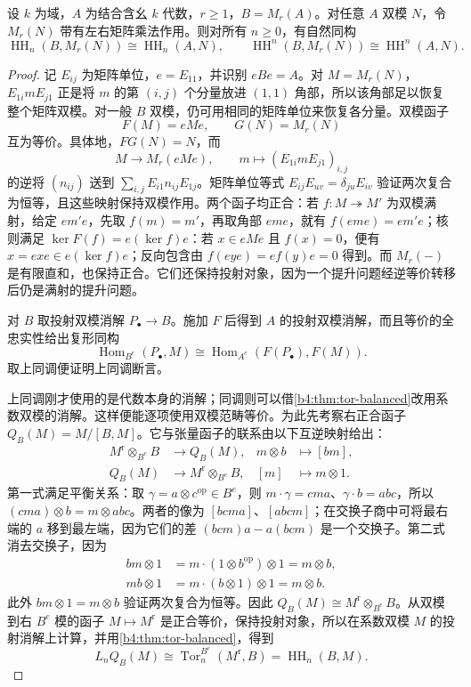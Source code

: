 \begin{theorem}\label{b4:thm:hh-matrix-morita}
	设 \(k\) 为域，\(A\) 为结合含幺 \(k\) 代数，\(r\ge1\)，\(B=M_r(A)\)。对任意 \(A\) 双模 \(N\)，令 \(M_r(N)\) 带有左右矩阵乘法作用。则对所有 \(n\ge0\)，有自然同构
	\[
		\operatorname{HH}_n(B,M_r(N))\cong\operatorname{HH}_n(A,N),\qquad \operatorname{HH}^n(B,M_r(N))\cong\operatorname{HH}^n(A,N).
	\]
\end{theorem}
\begin{proof}
	记 \(E_{ij}\) 为矩阵单位，\(e=E_{11}\)，并识别 \(eBe=A\)。对 \(M=M_r(N)\)，\(E_{1i}mE_{j1}\) 正是将 \(m\) 的第 \((i,j)\) 个分量放进 \((1,1)\) 角部，所以该角部足以恢复整个矩阵双模。对一般 \(B\) 双模，仍可用相同的矩阵单位来恢复各分量。双模函子
	\[
		F(M)=eMe,\qquad G(N)=M_r(N)
	\]
	互为等价。具体地，\(FG(N)=N\)，而
	\[
		M\longrightarrow M_r(eMe),\qquad m\longmapsto(E_{1i}mE_{j1})_{i,j}
	\]
	的逆将 \((n_{ij})\) 送到 \(\sum_{i,j}E_{i1}n_{ij}E_{1j}\)。矩阵单位等式 \(E_{ij}E_{uv}=\delta_{ju}E_{iv}\) 验证两次复合为恒等，且这些映射保持双模作用。两个函子均正合：若 \(f:M\twoheadrightarrow M'\) 为双模满射，给定 \(em'e\)，先取 \(f(m)=m'\)，再取角部 \(eme\)，就有 \(f(eme)=em'e\)；核则满足 \(\ker F(f)=e(\ker f)e\)：若 \(x\in eMe\) 且 \(f(x)=0\)，便有 \(x=exe\in e(\ker f)e\)；反向包含由 \(f(eye)=ef(y)e=0\) 得到。而 \(M_r(-)\) 是有限直和，也保持正合。它们还保持投射对象，因为一个提升问题经逆等价转移后仍是满射的提升问题。

	对 \(B\) 取投射双模消解 \(P_\bullet\to B\)。施加 \(F\) 后得到 \(A\) 的投射双模消解，而且等价的全忠实性给出复形同构
	\[
		\operatorname{Hom}_{B^e}(P_\bullet,M) \cong\operatorname{Hom}_{A^e}(F(P_\bullet),F(M)).
	\]
	取上同调便证明上同调断言。

	上同调刚才使用的是代数本身的消解；同调则可以借\cref{b4:thm:tor-balanced}改用系数双模的消解。这样便能逐项使用双模范畴等价。为此先考察右正合函子 \(Q_B(M)=M/[B,M]\)。它与张量函子的联系由以下互逆映射给出：
	\[
		\begin{aligned}
			M^{\mathrm r}\otimes_{B^e}B&\longrightarrow Q_B(M), &m\otimes b&\longmapsto[bm],\\
			Q_B(M)&\longrightarrow M^{\mathrm r}\otimes_{B^e}B, &[m]&\longmapsto m\otimes1.
		\end{aligned}
	\]
	第一式满足平衡关系：取 \(\gamma=a\otimes c^{\mathrm{op}}\in B^e\)，则 \(m\cdot\gamma=cma\)、\(\gamma\cdot b=abc\)，所以 \((cma)\otimes b=m\otimes abc\)。两者的像为 \([bcma]\)、\([abcm]\)；在交换子商中可将最右端的 \(a\) 移到最左端，因为它们的差 \((bcm)a-a(bcm)\) 是一个交换子。第二式消去交换子，因为
	\[
		\begin{aligned}
			bm\otimes1 &=m\cdot(1\otimes b^{\mathrm{op}})\otimes1 =m\otimes b,\\
			mb\otimes1 &=m\cdot(b\otimes1)\otimes1 =m\otimes b.
		\end{aligned}
	\]
	此外 \(bm\otimes1=m\otimes b\) 验证两次复合为恒等。因此 \(Q_B(M)\cong M^{\mathrm r}\otimes_{B^e}B\)。从双模到右 \(B^e\) 模的函子 \(M\mapsto M^{\mathrm r}\) 是正合等价，保持投射对象，所以在系数双模 \(M\) 的投射消解上计算，并用\cref{b4:thm:tor-balanced}，得到
	\[
		L_nQ_B(M) \cong\operatorname{Tor}^{B^e}_n(M^{\mathrm r},B) =\operatorname{HH}_n(B,M).
	\]


\end{proof}
